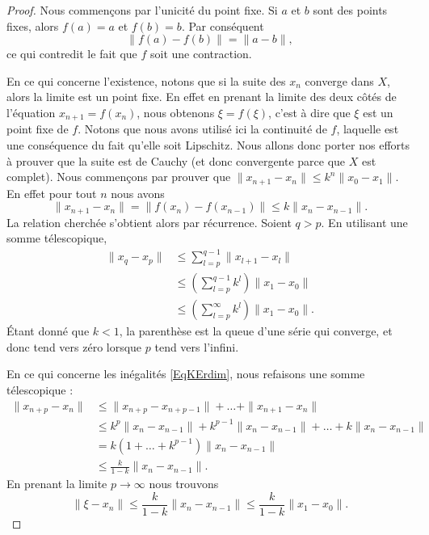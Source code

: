 \begin{proof}
    
    Nous commençons par l'unicité du point fixe. Si \( a\) et \( b\) sont des points fixes, alors \( f(a)=a\) et \( f(b)=b\). Par conséquent
    \begin{equation}
        \| f(a)-f(b) \|=\| a-b \|,
    \end{equation}
    ce qui contredit le fait que \( f\) soit une contraction.

    En ce qui concerne l'existence, notons que si la suite des \( x_n\) converge dans \( X\), alors la limite est un point fixe. En effet en prenant la limite des deux côtés de l'équation \( x_{n+1}=f(x_n)\), nous obtenons \( \xi=f(\xi)\), c'est à dire que \( \xi\) est un point fixe de \( f\). Notons que nous avons utilisé ici la continuité de \( f\), laquelle est une conséquence du fait qu'elle soit Lipschitz. Nous allons donc porter nos efforts à prouver que la suite est de Cauchy (et donc convergente parce que \( X\) est complet). Nous commençons par prouver que \( \| x_{n+1}-x_n \|\leq k^n\| x_0-x_1 \|\). En effet pour tout \( n\) nous avons
    \begin{equation}
        \| x_{n+1}-x_n \|=\| f(x_n)-f(x_{n-1}) \|\leq k\| x_n-x_{n-1} \|.
    \end{equation}
    La relation cherchée s'obtient alors par récurrence. Soient \( q>p\). En utilisant une somme télescopique,
    \begin{subequations}
        \begin{align}
            \| x_q-x_p \|&\leq \sum_{l=p}^{q-1}\| x_{l+1}-x_l \|\\
            &\leq\left( \sum_{l=p}^{q-1}k^l \right)\| x_1-x_0 \|\\
            &\leq\left(\sum_{l=p}^{\infty}k^l\right)\| x_1-x_0 \|.
        \end{align}
    \end{subequations}
    Étant donné que \( k<1\), la parenthèse est la queue d'une série qui converge, et donc tend vers zéro lorsque \( p\) tend vers l'infini.

    En ce qui concerne les inégalités \eqref{EqKErdim}, nous refaisons une somme télescopique :
    \begin{subequations}
        \begin{align}
            \| x_{n+p}-x_n \|&\leq \| x_{n+p}-x_{n+p-1} \|+\ldots +\| x_{n+1}-x_n \|\\
            &\leq k^p\| x_n-x_{n-1} \|+k^{p-1}\| x_n-x_{n-1} \|+\ldots +k\| x_n-x_{n-1} \|\\
            &=k(1+\ldots +k^{p-1})\| x_n-x_{n-1}\|  \\
            &\leq \frac{ k }{ 1-k }\| x_n-x_{n-1} \|.
        \end{align}
    \end{subequations}
    En prenant la limite \( p\to \infty\) nous trouvons
    \begin{equation}        \label{EqlUMVGW}
        \| \xi-x_n \|\leq \frac{ k }{ 1-k }\| x_n-x_{n-1} \|\leq \frac{ k }{ 1-k }\| x_1-x_0 \|.
    \end{equation}


\end{proof}
